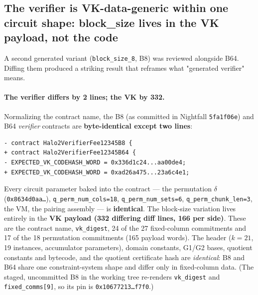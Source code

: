 \subsection{The verifier is VK-data-generic within one circuit shape: block\_size lives in the VK payload, not the code}
\label{sec:pr-vk-generic}

A second generated variant (\texttt{block\_size\_8}, B8) was
reviewed alongside B64. Diffing them produced a striking result
that reframes what "generated verifier" means.

\paragraph{The verifier differs by 2 lines; the VK by 332.}
Normalizing the contract name, the B8 (as committed in Nightfall
\texttt{5fa1f06e}) and B64 \emph{verifier}
contracts are \textbf{byte-identical except two lines}:
\begin{lstlisting}[style=plain]
- contract Halo2VerifierFee12345B8 {
+ contract Halo2VerifierFee12345B64 {
- EXPECTED_VK_CODEHASH_WORD = 0x336d1c24...aa00de4;
+ EXPECTED_VK_CODEHASH_WORD = 0xad26a475...23a6c4e1;
\end{lstlisting}
Every circuit parameter baked into the contract --- the
permutation $\delta$ (\texttt{0x8634d0aa\ldots}),
\texttt{q\_\allowbreak{}perm\_\allowbreak{}num\_\allowbreak{}cols=18}, \texttt{q\_\allowbreak{}perm\_\allowbreak{}num\_\allowbreak{}sets=6},
\texttt{q\_\allowbreak{}perm\_\allowbreak{}chunk\_\allowbreak{}len=3}, the VM, the pairing assembly ---
is \textbf{identical}. The block-size variation lives entirely
in the \textbf{VK payload (332 differing diff lines, 166 per side)}.
 These are the contract name, \texttt{vk\_digest},
24 of the 27 fixed-column commitments and 17 of the 18 permutation
commitments (165 payload words). The header ($k=21$, 19 instances,
accumulator parameters), domain constants, G1/G2 bases, quotient
constants and bytecode, and the quotient certificate hash are
\emph{identical}: B8 and B64 share one constraint-system shape and
differ only in fixed-column data. (The staged, uncommitted B8 in the
working tree re-renders \texttt{vk\_digest} and
\texttt{fixed\_comms[9]}, so its pin is \texttt{0x10677213\ldots f7f0}.)

